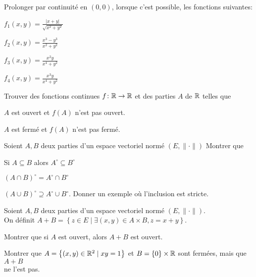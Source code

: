 \documentclass{report}
\begin{document}
\begin{exo}
    Prolonger par continuité en \((0,0)\), lorsque c'est possible,
    les fonctions suivantes:
    \begin{q}{1}
        \(f_1(x,y)=\frac{|x+y|}{\sqrt{x^2+y^2}}\)
    \end{q}
    \begin{q}{2}
        \(f_2(x,y)=\frac{x^3-y^3}{x^2+y^2}\)
    \end{q}
    \begin{q}{3}
        \(f_3(x,y)=\frac{x^2y}{x^4+y^2}\)
    \end{q}
    \begin{q}{4}
        \(f_4(x,y)=\frac{x^3y}{x^4+y^2}\)
    \end{q}
\end{exo}

\begin{exo}
    Trouver des fonctions continues \(f\colon\mathbb{R}\to\mathbb{R}\) et des parties \(A\) de \(\mathbb{R}\)
    telles que
    \begin{q}{1}
        \(A\) est ouvert et \(f(A)\) n'est pas ouvert.
    \end{q}
    \begin{q}{1}
        \(A\) est fermé et \(f(A)\) n'est pas fermé.
    \end{q}
\end{exo}

\begin{exo}
    Soient \(A,B\) deux parties d'un espace vectoriel normé \(\left(E,\|\cdot\|\right)\)
    Montrer que
    \begin{q}{1}
        Si \(A\subseteq B\) alors \(A^\circ\subseteq B^\circ\)
    \end{q}
    \begin{q}{2}
        \(\left(A\cap B\right)^\circ=A^\circ\cap B^\circ\)
    \end{q}
    \begin{q}{3}
        \(\left(A\cup B\right)^\circ \supseteq A^\circ \cup B^\circ\). Donner un exemple où l'inclusion est stricte.
    \end{q}
\end{exo}

\begin{exo}
    Soient \(A,B\) deux parties d'un espace vectoriel normé \(\left(E,\|\cdot\|\right)\).\\
    On définit \(A+B=\left\{ z\in E\mid \exists (x,y)\in A\times B, z=x+y \right\}\).
    \begin{q}{1}
        Montrer que si \(A\) est ouvert, alors \(A+B\) est ouvert.
    \end{q}
    \begin{q}{2}
        Montrer que \(A=\left\{ \left(x,y\right)\in\mathbb{R}^2\mid xy=1 \right\}\) et
        \(B=\{0\}\times\mathbb{R}\) sont fermées, mais que \(A+B\)\\ ne l'est pas.
    \end{q}
\end{exo}
\end{document}
